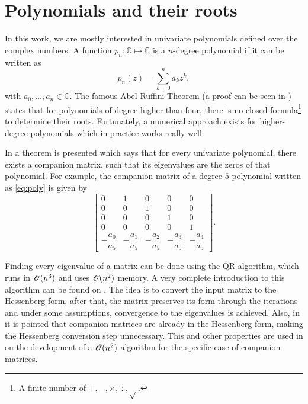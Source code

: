 \section{Polynomials and their roots}

In this work, we are mostly interested in univariate polynomials defined over the complex numbers.
A function $p_n: \mathbb{C} \mapsto \mathbb{C}$ is a $n$-degree polynomial if it can be written as
\begin{equation}\label{eq:poly}
p_n(z) = \sum_{k=0}^{n} a_k z^k,
\end{equation}
with $a_0, \dots, a_n \in \mathbb{C}$.
The famous Abel-Ruffini Theorem (a proof can be seen in ) states that for polynomials of degree higher than four, there is no closed formula\footnote{A finite number of $+, -, \times, \div, \sqrt{}$.} to determine their roots. Fortunately, a numerical approach exists for higher-degree polynomials which in practice works really well.

 In  a theorem is presented which says that for every univariate polynomial, there exists a companion matrix, such that its eigenvalues are the zeros of that polynomial. For example, the companion matrix of a degree-$5$ polynomial written as \autoref{eq:poly} is given by
 \begin{equation}
 \left[\begin{array}{ccccc}
 0 & 1 & 0 & 0 & 0\\
 0 & 0 & 1 & 0 & 0\\
 0 & 0 & 0 & 1 & 0\\
 0 & 0 & 0 & 0 & 1\\
 -\dfrac{a_0}{a_5} & -\dfrac{a_1}{a_5} & -\dfrac{a_2}{a_5} & -\dfrac{a_3}{a_5} & -\dfrac{a_4}{a_5}
 \end{array}\right].
 \end{equation}
 
 Finding every eigenvalue of a matrix can be done using the QR algorithm, which runs in $\mathscr{O}(n^3)$ and uses $\mathscr{O}(n^2)$ memory. A very complete introduction to this algorithm can be found on . The idea is to convert the input matrix to the Hessenberg form, after that, the matrix preserves its form through the iterations and under some assumptions, convergence to the eigenvalues is achieved.
 Also, in  it is pointed that companion matrices are already in the Hessenberg form, making the Hessenberg conversion step unnecessary. This and other properties are used in  on the development of a $\mathscr{O}(n^2)$ algorithm for the specific case of companion matrices.
 
